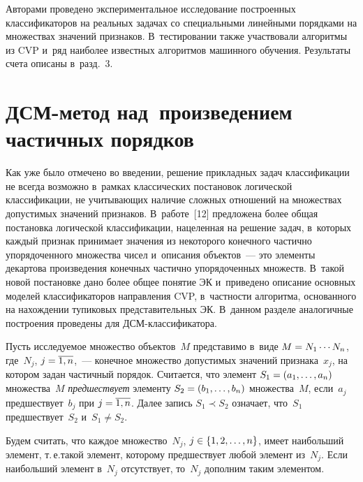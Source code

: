\begin{multicols}{2}
  Авторами проведено экспериментальное исследование построенных 
классификаторов на реальных задачах со специальными линейными по\-рядками 
на множествах значений признаков. В~тестирова\-нии также участ\-во\-ва\-ли 
алгоритмы из CVP и~ряд наиболее известных алгоритмов машинного обуче\-ния. 
Результаты счета описаны в~разд.~3.

\vspace*{-6pt}

\section{ДСМ-метод над~произведением частичных порядков}

\vspace*{-3pt}

  Как уже было отмечено во введении, решение прикладных задач 
классификации не всегда возможно в~рамках классических постановок 
логической классификации, не учитывающих наличие сложных отношений на 
множествах допустимых значений признаков. В~работе~[12] предложена более 
общая постановка логической классификации, нацеленная на решение задач, 
в~которых каждый признак принимает значения из некоторого конечного 
час\-тич\-но упорядоченного множества чисел и~описания объектов~--- это 
элементы декартова произведения конечных час\-тич\-но упорядоченных 
множеств. В~такой новой постановке дано более общее понятие ЭК 
и~приведено описание основных моделей классификаторов направления CVP, 
в~част\-ности алгоритма, основанного на нахождении тупиковых 
представительных ЭК. В~данном разделе аналогичные построения проведены 
для ДСМ-клас\-си\-фи\-ка\-тора.
  
  Пусть исследуемое множество объектов~$M$ представимо в~виде $M\hm= 
N_1 \cdots N_n$, где~$N_j$, $j\hm=\overline{1, n}$,~--- конечное 
множество допустимых значений признака~$x_j$, на котором задан час\-тич\-ный 
порядок. \mbox{Считается}, что элемент $S_1\hm=(a_1, \ldots , a_n)$ множества~$M$ 
\textit{предшествует} элементу $S_2\hm= (b_1, \ldots , b_n)$ множества~$M$, 
если~$a_j$ предшествует~$b_j$ при $j\hm=\overline{1, n}$. Далее запись 
$S_1\prec S_2$ означает, что~$S_1$ предшествует~$S_2$ и~$S_1\not= S_2$.
  
  Будем считать, что каждое множество~$N_j$, $j\hm\in \{1,2,\ldots , n\}$, имеет 
наибольший элемент, т.\,е.\linebreak такой элемент, которому предшествует любой 
элемент из~$N_j$. Если наибольший элемент в~$N_j$ отсутствует, то~$N_j$ 
дополним таким элементом.
  

\end{multicols}
